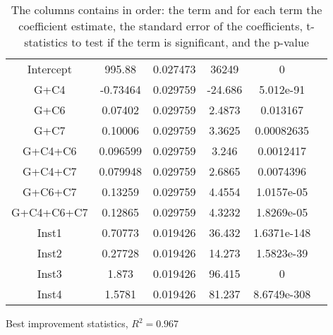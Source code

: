 \documentclass[../main.tex]{subfiles}
\begin{document}
\begin{table}
\begin{adjustbox}{width=\columnwidth,center}
\begin{subtable}{.75\columnwidth}
\begin{tabular}{cccccc}
            \hline                
        Intercept       & 995.88    & 0.027473      & 36249     & 0         \\
            G+C4        & -0.73464  & 0.029759      & -24.686   & 5.012e-91 \\
            G+C6        & 0.07402   & 0.029759      & 2.4873    & 0.013167  \\
            G+C7        & 0.10006   & 0.029759      & 3.3625    & 0.00082635\\
            G+C4+C6     & 0.096599  & 0.029759      & 3.246     & 0.0012417 \\
            G+C4+C7     & 0.079948  & 0.029759      & 2.6865    & 0.0074396 \\
            G+C6+C7     & 0.13259   & 0.029759      & 4.4554    & 1.0157e-05\\
            G+C4+C6+C7  & 0.12865   & 0.029759      & 4.3232    & 1.8269e-05\\
            Inst1       & 0.70773   & 0.019426      & 36.432    &1.6371e-148\\
            Inst2       & 0.27728   & 0.019426      & 14.273    & 1.5823e-39\\
            Inst3       & 1.873     & 0.019426      & 96.415    & 0         \\
            Inst4       & 1.5781    & 0.019426      & 81.237    &8.6749e-308\\
            \hline
            \end{tabular}
        \caption{Best improvement statistics, $R^2=0.967$}
        \label{tab:regrBestGroup}
        \end{subtable}
    \end{adjustbox}
    \label{tab:regrGroup}
    \caption*{The columns contains in order: the term and for each term the coefficient estimate, the standard error of the coefficients, t-statistics to test if the term is significant, and the p-value}
\end{table}
\end{document}
